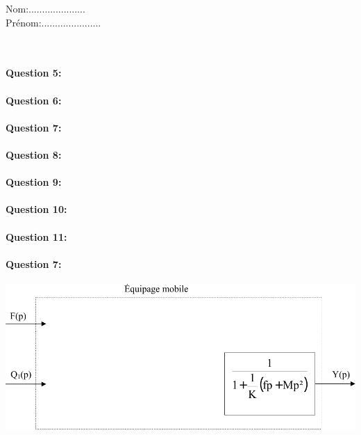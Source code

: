 \newpage
\cleardoublepage

Nom:.....................\\
Prénom:......................

~\

\paragraph{Question 5:}

\reponse[5]

\paragraph{Question 6:}

\reponse[5]


\paragraph{Question 7:}

\reponse[5]

\paragraph{Question 8:}

\reponse[5]

\paragraph{Question 9:}

\reponse[5]

\paragraph{Question 10:}

\reponse[5]

\paragraph{Question 11:}

\reponse[5]


\iffalse
\paragraph{Question 7:}

\begin{center}
 \includegraphics[width=0.8\linewidth]{img/SB1}
\end{center}

